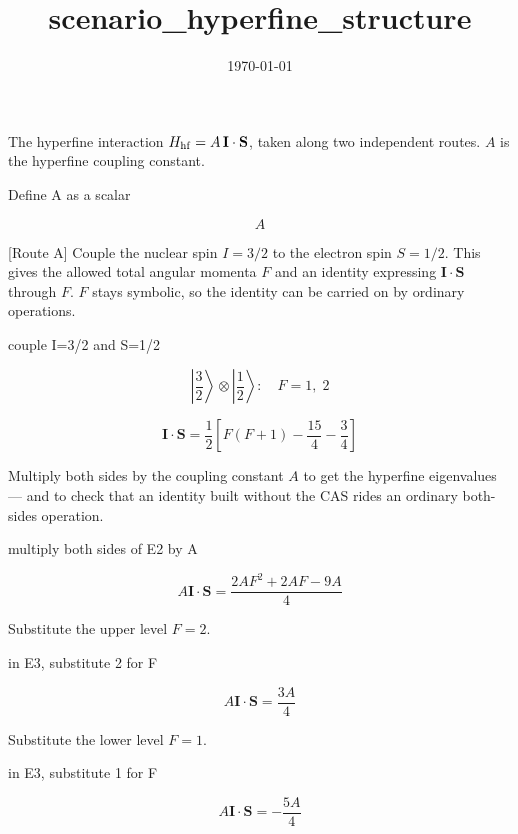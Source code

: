 \documentclass[dvipdfmx]{article}
\title{scenario\_hyperfine\_structure}
\date{\today}
\begin{document}
\maketitle

The hyperfine interaction $H_{\rm hf}=A\,\mathbf I\cdot\mathbf S$, taken along two independent routes. $A$ is the hyperfine coupling constant.

Define A as a scalar

\[
  A
\]

[Route A] Couple the nuclear spin $I=3/2$ to the electron spin $S=1/2$. This gives the allowed total angular momenta $F$ and an identity expressing $\mathbf I\cdot\mathbf S$ through $F$. $F$ stays symbolic, so the identity can be carried on by ordinary operations.

couple I=3/2 and S=1/2

\begin{equation}
  \left| \frac{3}{2} \right\rangle \otimes \left| \frac{1}{2} \right\rangle:\quad F = 1,\; 2
  \label{eq:E1}
\end{equation}

\begin{equation}
  \mathbf{I}\cdot\mathbf{S} = \frac{1}{2}\left[ F(F+1) - \frac{15}{4} - \frac{3}{4} \right]
  \label{eq:E2}
\end{equation}

Multiply both sides by the coupling constant $A$ to get the hyperfine eigenvalues — and to check that an identity built without the CAS rides an ordinary both-sides operation.

multiply both sides of E2 by A

\begin{equation}
  A \mathbf{I}\cdot\mathbf{S} = \frac{2 A F^2+2 A F-9 A}{4}
  \label{eq:E3}
\end{equation}

Substitute the upper level $F=2$.

in E3, substitute 2 for F

\begin{equation}
  A \mathbf{I}\cdot\mathbf{S} = \frac{3 A}{4}
  \label{eq:E4}
\end{equation}

Substitute the lower level $F=1$.

in E3, substitute 1 for F

\begin{equation}
  A \mathbf{I}\cdot\mathbf{S} = -\frac{5 A}{4}
  \label{eq:E5}
\end{equation}
\end{document}
